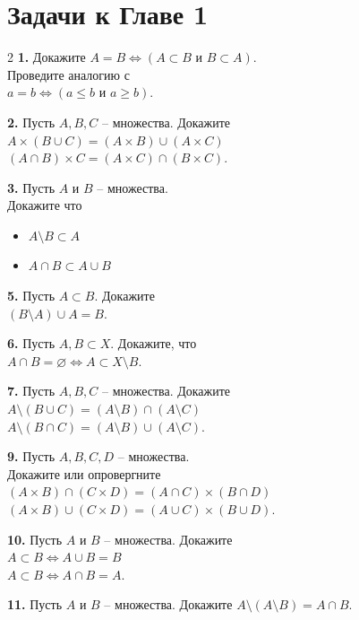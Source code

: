 \section{Задачи к Главе 1}
\begin{multicols}{2}
\noindent\textbf{1.}
Докажите $A=B\iff (A\subset B\text{ и }B\subset A)$.\\
Проведите аналогию с\\ $a=b\iff (a\leq b\text{ и }a\geq b)$.

\bigskip\noindent\textbf{2.}
Пусть $A,B,C$ -- множества. Докажите\\
$A\times (B\cup C)=(A\times B)\cup (A\times C)$\\
$(A\cap B)\times C=(A\times C)\cap (B\times C)$.

\bigskip\noindent\textbf{3.}
Пусть $A$ и $B$ -- множества.\\ Докажите что
\begin{itemize}
\item $A\setminus B\subset A$
\item $A\cap B\subset A\cup B$
\end{itemize}

\bigskip\noindent\textbf{5.}
Пусть $A \subset B$. Докажите\\$(B\setminus A)\cup A=B$.

\bigskip\noindent\textbf{6.}
Пусть $A,B\subset X$. Докажите, что\\
$A\cap B=\varnothing\Leftrightarrow A\subset X\setminus B.$

\bigskip\noindent\textbf{7.}
Пусть $A,B,C$ -- множества. Докажите\\
$A\setminus (B\cup C)=(A\setminus B)\cap (A\setminus C)$\\
$A\setminus (B\cap C)=(A\setminus B)\cup (A\setminus C)$.

\bigskip\noindent\textbf{9.}
Пусть $A,B,C,D$ -- множества.\\
Докажите или опровергните\\
$(A\times B)\cap (C\times D)=(A\cap C)\times (B\cap D)$\\
$(A\times B)\cup (C\times D)=(A\cup C)\times (B\cup D)$.

\bigskip\noindent\textbf{10.}
Пусть $A$ и $B$ -- множества. Докажите\\
$A\subset B \Leftrightarrow A\cup B=B$\\
$A\subset B \Leftrightarrow A\cap B=A$.

\bigskip\noindent\textbf{11.}
Пусть $A$ и $B$ -- множества. Докажите
$A\setminus (A\setminus B)=A\cap B$.


\end{multicols}
